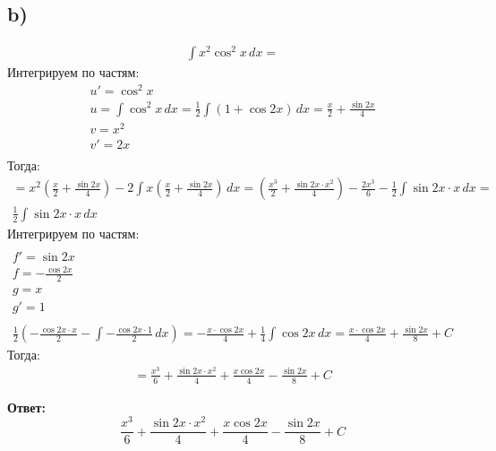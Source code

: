\documentclass[a4paper,12pt]{article}
\begin{document}
\subsection*{b)}
\begin{equation*}
\begin{gathered}
\int x^2 \cos^2 x \, dx = 
\end{gathered}
\end{equation*}
Интегрируем по частям:
\begin{equation*}
\begin{gathered}
u' = \cos^2 x\\
u = \int \cos^2x  \, dx = \frac{1}{2} \int (1 + \cos 2x)\, dx = \frac{x}{2} + \frac{\sin 2x}{4} \\
v = x^2 \\
v' = 2x \\
\end{gathered}
\end{equation*}
Тогда:
\begin{equation*}
\begin{gathered}
=  x^2 \left(\frac{x}{2} + \frac{\sin 2x}{4}\right) - 2 \int x \left( \frac{x}{2} + \frac{\sin 2x}{4}\right) \, dx = \left(\frac{x^3}{2} + \frac{\sin 2x \cdot x^2}{4}\right) -  \frac{2x^3}{6} - \frac{1}{2} \int \sin 2x \cdot x \, dx = 
\\
\frac{1}{2} \int \sin 2x \cdot x \, dx
\end{gathered}
\end{equation*}
Интегрируем по частям:
\begin{equation*}
\begin{gathered}
\\
f' = \sin 2x \\
f = -\frac{\cos 2x}{2}\\
g = x\\
g' = 1 \\
\\
\frac{1}{2} \left(-\frac{\cos 2x \cdot x}{2}  - \int -\frac{\cos 2x \cdot 1}{2} \, dx\right)  =- \frac{x \cdot \cos 2x}{4} + \frac{1}{4} \int \cos 2x \, dx  = \frac{x \cdot \cos 2x}{4} + \frac{\sin 2x}{8} + C
\end{gathered}
\end{equation*}
Тогда:
\begin{equation*}
\begin{gathered}
= \frac{x^3}{6} + \frac{\sin 2x \cdot x^2}{4} + \frac{x \cos 2x}{4} - \frac{\sin 2x }{8} + C
\end{gathered}
\end{equation*}
\begin{center}
{\Large \textbf{Ответ: } 
\[
\frac{x^3}{6} + \frac{\sin 2x \cdot x^2}{4} + \frac{x \cos 2x}{4} - \frac{\sin 2x }{8} + C
\]}
\end{center}
\end{document}
